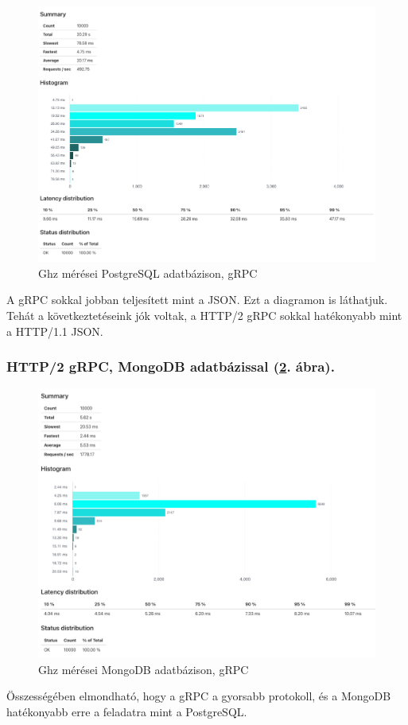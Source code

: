 \begin{figure}[hbt!]
    \centering
    \includegraphics[scale=0.3]{images/ghz-postgres}
    \caption{Ghz mérései PostgreSQL adatbázison, gRPC}
    \label{fig:ghz-postgres}
\end{figure}

\begin{remark}
    A gRPC sokkal jobban teljesített mint a JSON.
    Ezt a diagramon is láthatjuk.
    Tehát a következtetéseink jók voltak, a HTTP/2 gRPC sokkal hatékonyabb mint a HTTP/1.1 JSON.
\end{remark}


\subsubsection{HTTP/2 gRPC, MongoDB adatbázissal (\ref{fig:ghz-mongo}. ábra).}
\begin{figure}[hbt!]
    \centering
    \includegraphics[scale=0.3]{images/ghz-mongo}
    \caption{Ghz mérései MongoDB adatbázison, gRPC}
    \label{fig:ghz-mongo}
\end{figure}

Összességében elmondható, hogy a gRPC a gyorsabb protokoll, és a MongoDB hatékonyabb erre a feladatra mint a PostgreSQL.



